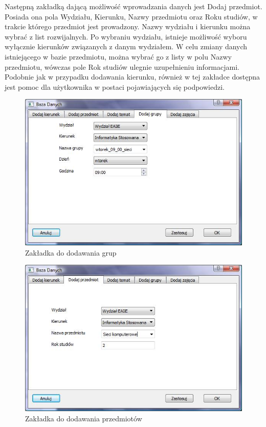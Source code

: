 Następną zakładką dającą możliwość wprowadzania danych jest Dodaj przedmiot. Posiada ona pola Wydziału, Kierunku, Nazwy przedmiotu oraz Roku studiów, w trakcie którego przedmiot jest prowadzony. Nazwy wydziału i kierunku można wybrać z list rozwijalnych. Po wybraniu wydziału, istnieje możliwość wyboru wyłącznie kierunków związanych z danym wydziałem. W celu zmiany danych istniejącego w bazie przedmiotu, można wybrać go z listy w polu Nazwy przedmiotu, wówczas pole Rok studiów ulegnie uzupełnieniu informacjami. Podobnie jak w przypadku dodawania kierunku, również w tej zakładce dostępna jest pomoc dla użytkownika w postaci pojawiających się podpowiedzi. 
\begin{figure}
\begin{center}
\includegraphics[scale=0.7]{dodaj_grupe.jpg}
\caption{Zakładka do dodawania grup}
\label{fig:dodajGrupe}
\end{center}
\end{figure}

\begin{figure}
\begin{center}
\includegraphics[scale=0.7]{dodaj_przedmiot.jpg}
\caption{Zakładka do dodawania przedmiotów}
\label{fig:dodajPrzedmiot}
\end{center}
\end{figure}

